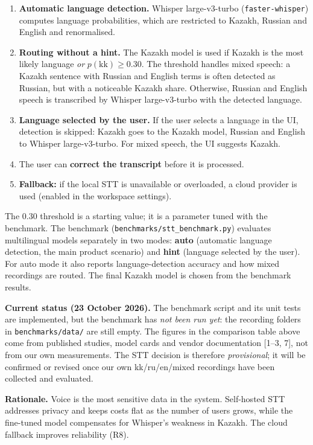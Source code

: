 \documentclass[11pt,a4paper]{article}
\newcommand{\code}[1]{\texttt{#1}}
\begin{document}
\begin{enumerate}
  \item \textbf{Automatic language detection.} Whisper large-v3-turbo (\code{faster-whisper}) computes language probabilities, which are restricted to Kazakh, Russian and English and renormalised.
  \item \textbf{Routing without a hint.} The Kazakh model is used if Kazakh is the most likely language \emph{or} $p(\mathrm{kk}) \ge 0.30$. The threshold handles mixed speech: a Kazakh sentence with Russian and English terms is often detected as Russian, but with a noticeable Kazakh share. Otherwise, Russian and English speech is transcribed by Whisper large-v3-turbo with the detected language.
  \item \textbf{Language selected by the user.} If the user selects a language in the UI, detection is skipped: Kazakh goes to the Kazakh model, Russian and English to Whisper large-v3-turbo. For mixed speech, the UI suggests Kazakh.
  \item The user can \textbf{correct the transcript} before it is processed.
  \item \textbf{Fallback:} if the local STT is unavailable or overloaded, a cloud provider is used (enabled in the workspace settings).
\end{enumerate}

The 0.30 threshold is a starting value; it is a parameter tuned with the benchmark. The benchmark (\code{benchmarks/stt\_benchmark.py}) evaluates multilingual models separately in two modes: \textbf{auto} (automatic language detection, the main product scenario) and \textbf{hint} (language selected by the user). For auto mode it also reports language-detection accuracy and how mixed recordings are routed. The final Kazakh model is chosen from the benchmark results.

\textbf{Current status (23 October 2026).} The benchmark script and its unit tests are implemented, but the benchmark has \emph{not been run yet}: the recording folders in \code{benchmarks/data/} are still empty. The figures in the comparison table above come from published studies, model cards and vendor documentation [1--3, 7], not from our own measurements. The STT decision is therefore \emph{provisional}; it will be confirmed or revised once our own kk/ru/en/mixed recordings have been collected and evaluated.

\textbf{Rationale.} Voice is the most sensitive data in the system. Self-hosted STT addresses privacy and keeps costs flat as the number of users grows, while the fine-tuned model compensates for Whisper's weakness in Kazakh. The cloud fallback improves reliability (R8).
\end{document}

